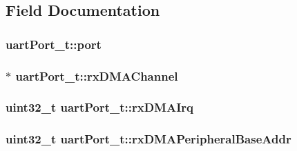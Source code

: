 \subsection{Field Documentation}
\hypertarget{structuartPort__t_ad41850c792e7215dc5e19d6850f256c3}{
\subsubsection[{port}]{ uart\+Port\+\_\+t\+::port}}\label{structuartPort__t_ad41850c792e7215dc5e19d6850f256c3}
\hypertarget{structuartPort__t_aab2466933b4f50a9683cf4e38b7339b2}{
\subsubsection[{rx\+D\+M\+A\+Channel}]{$\ast$ uart\+Port\+\_\+t\+::rx\+D\+M\+A\+Channel}}\label{structuartPort__t_aab2466933b4f50a9683cf4e38b7339b2}
\hypertarget{structuartPort__t_a26bda335a9f5a35768510983b7c5175d}{
\subsubsection[{rx\+D\+M\+A\+Irq}]{\setlength{\rightskip}{0pt plus 5cm}uint32\+\_\+t uart\+Port\+\_\+t\+::rx\+D\+M\+A\+Irq}}\label{structuartPort__t_a26bda335a9f5a35768510983b7c5175d}
\hypertarget{structuartPort__t_a21b754ebbfbf509d00ed75df5c59b3e8}{
\subsubsection[{rx\+D\+M\+A\+Peripheral\+Base\+Addr}]{\setlength{\rightskip}{0pt plus 5cm}uint32\+\_\+t uart\+Port\+\_\+t\+::rx\+D\+M\+A\+Peripheral\+Base\+Addr}}\label{structuartPort__t_a21b754ebbfbf509d00ed75df5c59b3e8}
